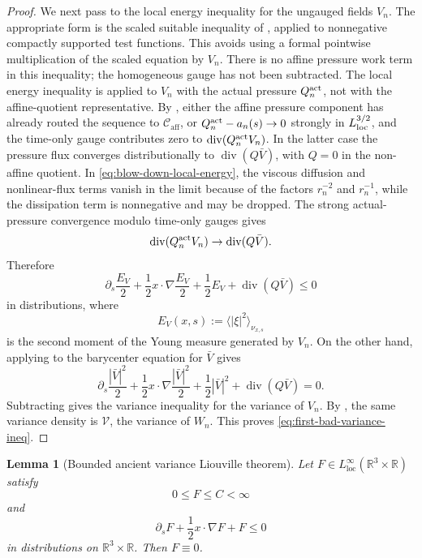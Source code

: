 \documentclass[11pt]{amsart}
\numberwithin{equation}{section}
\theoremstyle{plain}
\newtheorem{lemma}[lemma]{Lemma}
\theoremstyle{definition}
\theoremstyle{remark}
\newcommand{\loc}{\mathrm{loc}}
\newcommand{\divergence}{\operatorname{div}}
\newcommand{\Caff}{\mathcal C_{\mathrm{aff}}}
\begin{document}
\begin{proof}
We next pass to the local energy inequality for the ungauged fields \(V_n\).
The appropriate form is the scaled suitable inequality of
, applied to nonnegative compactly supported
test functions.  This avoids using a formal pointwise multiplication of the
scaled equation by \(V_n\).  There is no affine pressure work term in this
inequality; the homogeneous gauge has not been subtracted.  The local energy
inequality is applied to \(V_n\) with the actual pressure
\(Q_n^{\rm act}\), not with the affine-quotient representative.  By
, either the affine pressure
component has already routed the sequence to \(\Caff\), or
\(Q_n^{\rm act}-a_n(s)\to0\) strongly in \(L^{3/2}_{\rm loc}\), and the
time-only gauge contributes zero to \(\divergence(Q_n^{\rm act}V_n)\).  In the
latter case the pressure flux converges distributionally to
\(\divergence(Q\bar V)\), with \(Q=0\) in the non-affine quotient.  In
\eqref{eq:blow-down-local-energy}, the viscous diffusion and nonlinear-flux
terms vanish in the limit because of the factors \(r_n^{-2}\) and
\(r_n^{-1}\), while the dissipation term is nonnegative and may be dropped.
The strong actual-pressure convergence modulo time-only gauges gives
\[
   \divergence(Q_n^{\rm act}V_n)\to\divergence(Q\bar V).
\]
Therefore
\[
   \partial_s\frac{E_V}{2}
   +\frac12x\cdot\nabla\frac{E_V}{2}
   +\frac12E_V
   +\divergence(Q\bar V)
   \le0
\]
in distributions, where
\[
   E_V(x,s):=\langle|\xi|^2\rangle_{\nu_{x,s}}
\]
is the second moment of the Young measure generated by \(V_n\).  On the other
hand, applying  to the
barycenter equation for \(\bar V\) gives
\[
   \partial_s\frac{|\bar V|^2}{2}
   +\frac12x\cdot\nabla\frac{|\bar V|^2}{2}
   +\frac12|\bar V|^2
   +\divergence(Q\bar V)=0 .
\]
Subtracting gives the variance inequality for the variance of \(V_n\).  By
, the same variance density is
\(\mathcal V\), the variance of \(W_n\).  This proves
\eqref{eq:first-bad-variance-ineq}.
\end{proof}

\begin{lemma}[Bounded ancient variance Liouville theorem]
\label{lem:bounded-variance-liouville}
Let \(F\in L^\infty_{\loc}(\mathbb R^3\times\mathbb R)\) satisfy
\[
   0\le F\le C<\infty
\]
and
\[
   \partial_sF+\frac12x\cdot\nabla F+F\le0
\]
in distributions on \(\mathbb R^3\times\mathbb R\).  Then \(F\equiv0\).
\end{lemma}
\end{document}
